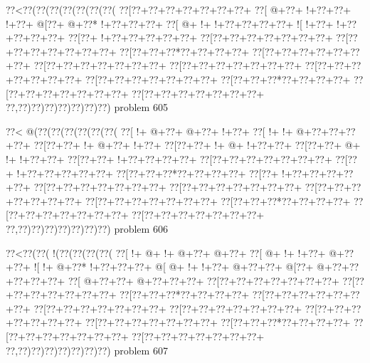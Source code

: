 \vbox{\vbox{\goo
\0??<\0??(\0??(\0??(\0??(\0??(\0??(\0??(
\0??[\0??+\0??+\0??+\0??+\0??+\0??+\0??+
\0??[\- @+\0??+\- !+\0??+\0??+\- !+\0??+
\- @[\0??+\- @+\0??*\- !+\0??+\0??+\0??+
\0??[\- @+\- !+\- !+\0??+\0??+\0??+\0??+
\- ![\- !+\0??+\- !+\0??+\0??+\0??+\0??+
\0??[\0??+\- !+\0??+\0??+\0??+\0??+\0??+
\0??[\0??+\0??+\0??+\0??+\0??+\0??+\0??+
\0??[\0??+\0??+\0??+\0??+\0??+\0??+\0??+
\0??[\0??+\0??+\0??*\0??+\0??+\0??+\0??+
\0??[\0??+\0??+\0??+\0??+\0??+\0??+\0??+
\0??[\0??+\0??+\0??+\0??+\0??+\0??+\0??+
\0??[\0??+\0??+\0??+\0??+\0??+\0??+\0??+
\0??[\0??+\0??+\0??+\0??+\0??+\0??+\0??+
\0??[\0??+\0??+\0??+\0??+\0??+\0??+\0??+
\0??[\0??+\0??+\0??*\0??+\0??+\0??+\0??+
\0??[\0??+\0??+\0??+\0??+\0??+\0??+\0??+
\0??[\0??+\0??+\0??+\0??+\0??+\0??+\0??+
\0??,\0??)\0??)\0??)\0??)\0??)\0??)\0??)
}
\hfil problem 605\hfil\break
}

\vbox{\vbox{\goo
\0??<\- @(\0??(\0??(\0??(\0??(\0??(\0??(
\0??[\- !+\- @+\0??+\- @+\0??+\- !+\0??+
\0??[\- !+\- !+\- @+\0??+\0??+\0??+\0??+
\0??[\0??+\0??+\- !+\- @+\0??+\- !+\0??+
\0??[\0??+\0??+\- !+\- @+\- !+\0??+\0??+
\0??[\0??+\0??+\- @+\- !+\- !+\0??+\0??+
\0??[\0??+\0??+\- !+\0??+\0??+\0??+\0??+
\0??[\0??+\0??+\0??+\0??+\0??+\0??+\0??+
\0??[\0??+\- !+\0??+\0??+\0??+\0??+\0??+
\0??[\0??+\0??+\0??*\0??+\0??+\0??+\0??+
\0??[\0??+\- !+\0??+\0??+\0??+\0??+\0??+
\0??[\0??+\0??+\0??+\0??+\0??+\0??+\0??+
\0??[\0??+\0??+\0??+\0??+\0??+\0??+\0??+
\0??[\0??+\0??+\0??+\0??+\0??+\0??+\0??+
\0??[\0??+\0??+\0??+\0??+\0??+\0??+\0??+
\0??[\0??+\0??+\0??*\0??+\0??+\0??+\0??+
\0??[\0??+\0??+\0??+\0??+\0??+\0??+\0??+
\0??[\0??+\0??+\0??+\0??+\0??+\0??+\0??+
\0??,\0??)\0??)\0??)\0??)\0??)\0??)\0??)
}
\hfil problem 606\hfil\break
}

\vbox{\vbox{\goo
\0??<\0??(\0??(\- !(\0??(\0??(\0??(\0??(
\0??[\- !+\- @+\- !+\- @+\0??+\- @+\0??+
\0??[\- @+\- !+\- !+\0??+\- @+\0??+\0??+
\- ![\- !+\- @+\0??*\- !+\0??+\0??+\0??+
\- @[\- @+\- !+\- !+\0??+\- @+\0??+\0??+
\- @[\0??+\- @+\0??+\0??+\0??+\0??+\0??+
\0??[\- @+\0??+\0??+\- @+\0??+\0??+\0??+
\0??[\0??+\0??+\0??+\0??+\0??+\0??+\0??+
\0??[\0??+\0??+\0??+\0??+\0??+\0??+\0??+
\0??[\0??+\0??+\0??*\0??+\0??+\0??+\0??+
\0??[\0??+\0??+\0??+\0??+\0??+\0??+\0??+
\0??[\0??+\0??+\0??+\0??+\0??+\0??+\0??+
\0??[\0??+\0??+\0??+\0??+\0??+\0??+\0??+
\0??[\0??+\0??+\0??+\0??+\0??+\0??+\0??+
\0??[\0??+\0??+\0??+\0??+\0??+\0??+\0??+
\0??[\0??+\0??+\0??*\0??+\0??+\0??+\0??+
\0??[\0??+\0??+\0??+\0??+\0??+\0??+\0??+
\0??[\0??+\0??+\0??+\0??+\0??+\0??+\0??+
\0??,\0??)\0??)\0??)\0??)\0??)\0??)\0??)
}
\hfil problem 607\hfil\break
}

